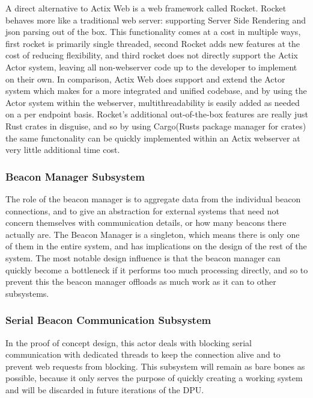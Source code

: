 \bigskip
A direct alternative to Actix Web is a web framework called Rocket.
Rocket behaves more like a traditional web server: supporting \Gls{Server Side Rendering} and json parsing out of the box.
This functionality comes at a cost in multiple ways, first rocket is primarily single threaded, second Rocket adds new features at the cost of reducing flexibility, and third rocket does not directly support the Actix Actor system, leaving all non-webserver code up to the developer to implement on their own.
In comparison, Actix Web does support and extend the Actor system which makes for a more integrated and unified codebase, and by using the Actor system within the webserver, multithreadability is easily added as needed on a per endpoint basis.
Rocket's additional out-of-the-box features are really just Rust crates in disguise, and so by using Cargo(Rusts package manager for crates) the same functonality can be quickly implemented within an Actix webserver at very little additional time cost.

\medskip
\subsubsection{Beacon Manager Subsystem}
\medskip
The role of the beacon manager is to aggregate data from the individual beacon connections, and to give an abstraction for external systems that need not concern themselves with communication details, or how many beacons there actually are.
The Beacon Manager is a singleton, which means there is only one of them in the entire system, and has implications on the design of the rest of the system.
The most notable design influence is that the beacon manager can quickly become a bottleneck if it performs too much processing directly, and so to prevent this the beacon manager offloads as much work as it can to other subsystems.

\medskip
\subsubsection{Serial Beacon Communication Subsystem}
\medskip
In the proof of concept design, this actor deals with blocking serial communication with dedicated threads to keep the connection alive and to prevent web requests from blocking.
This subsystem will remain as bare bones as possible, because it only serves the purpose of quickly creating a working system and will be discarded in future iterations of the DPU.

\pagebreak
